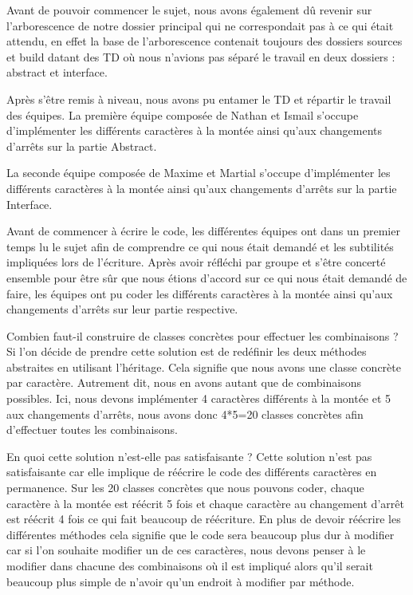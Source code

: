 \documentclass{article}
\begin{document}
Avant de pouvoir commencer le sujet, nous avons également dû revenir sur l’arborescence de notre dossier principal qui ne correspondait pas à ce qui était attendu, en effet la base de l’arborescence contenait toujours des dossiers sources et build datant des TD où nous n’avions pas séparé le travail en deux dossiers : abstract et interface.

Après s’être remis à niveau, nous avons pu entamer le TD et répartir le travail des équipes. La première équipe composée de Nathan et Ismail s’occupe d’implémenter les différents caractères à la montée ainsi qu’aux changements d’arrêts sur la partie Abstract.

La seconde équipe composée de Maxime et Martial s’occupe d’implémenter les différents caractères à la montée ainsi qu’aux changements d’arrêts sur la partie Interface.

Avant de commencer à écrire le code, les différentes équipes ont dans un premier temps lu le sujet afin de comprendre ce qui nous était demandé et les subtilités impliquées lors de l’écriture. Après avoir réfléchi par groupe et s’être concerté ensemble pour être sûr que nous étions d’accord sur ce qui nous était demandé de faire, les équipes ont pu coder les différents caractères à la montée ainsi qu’aux changements d’arrêts sur leur partie respective.
\newline

Combien faut-il construire de classes concrètes pour effectuer les combinaisons ?
\\
Si l’on décide de prendre cette solution est de redéfinir les deux méthodes abstraites en utilisant l’héritage. Cela signifie que nous avons une classe concrète par caractère. Autrement dit, nous en avons autant que de combinaisons possibles.
Ici, nous devons implémenter 4 caractères différents à la montée et 5 aux changements d’arrêts, nous avons donc 4*5=20 classes concrètes afin d’effectuer toutes les combinaisons.
\newline


En quoi cette solution n’est-elle pas satisfaisante ?
Cette solution n’est pas satisfaisante car elle implique de réécrire le code des différents caractères en permanence. Sur les 20 classes concrètes que nous pouvons coder, chaque caractère à la montée est réécrit 5 fois et chaque caractère au changement d’arrêt est réécrit 4 fois ce qui fait beaucoup de réécriture. En plus de devoir réécrire les différentes méthodes cela signifie que le code sera beaucoup plus dur à modifier car si l’on souhaite modifier un de ces caractères, nous devons penser à le modifier dans chacune des combinaisons où il est impliqué alors qu’il serait beaucoup plus simple de n’avoir qu’un endroit à modifier par méthode.
\newline
\end{document}
